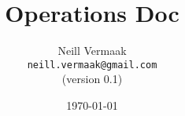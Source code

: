 \title{ \huge{ \textbf{ \luma{} Operations Doc } } }

\author{
    Neill Vermaak\\
    \texttt{neill.vermaak@gmail.com}\\
    (version 0.1)
}

\date{\today}

\maketitle
\newpage
